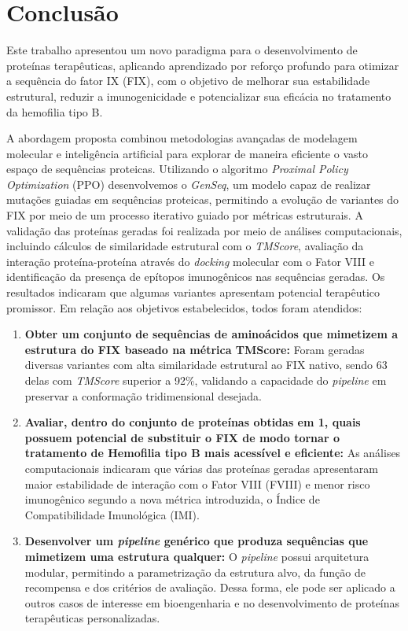 \chapter{Conclusão}

Este trabalho apresentou um novo paradigma para o desenvolvimento de proteínas terapêuticas,
aplicando aprendizado por reforço profundo para otimizar a sequência do fator IX (FIX),
com o objetivo de melhorar sua estabilidade estrutural, 
reduzir a imunogenicidade e potencializar sua eficácia no tratamento da hemofilia tipo B.  


A abordagem proposta combinou metodologias avançadas de modelagem molecular e inteligência artificial 
para explorar de maneira eficiente o vasto espaço de sequências proteicas. 
Utilizando o algoritmo \textit{Proximal Policy Optimization} (PPO)
desenvolvemos o \textit{GenSeq}, um modelo capaz de realizar mutações guiadas em sequências proteicas,
permitindo a evolução de variantes do FIX por meio de um processo iterativo
guiado por métricas estruturais.
A validação das proteínas geradas foi realizada por meio de análises computacionais, 
incluindo cálculos de similaridade estrutural com o \textit{TMScore}, 
avaliação da interação proteína-proteína através do \textit{docking} molecular com o Fator VIII
e identificação da presença de epítopos imunogênicos nas sequências geradas.
Os resultados indicaram que algumas variantes apresentam potencial terapêutico promissor.
Em relação aos objetivos estabelecidos, todos foram atendidos:

\begin{enumerate}
    \item \textbf{Obter um conjunto de sequências de aminoácidos que mimetizem a estrutura do FIX baseado na métrica TMScore:} 
    Foram geradas diversas variantes com alta similaridade estrutural ao FIX nativo, sendo 
    63 delas com \textit{TMScore} superior a 92\%,
    validando a capacidade do \textit{pipeline} em preservar a conformação tridimensional desejada.
    \item \textbf{Avaliar, dentro do conjunto de proteínas obtidas em 1, quais possuem potencial de substituir o FIX de modo tornar o tratamento de Hemofilia tipo B mais acessível e eficiente:} 
    As análises computacionais indicaram que várias das proteínas geradas apresentaram 
    maior estabilidade de interação com o Fator VIII (FVIII) 
    e menor risco imunogênico segundo a nova métrica introduzida, 
    o Índice de Compatibilidade Imunológica (IMI). 
    \item \textbf{Desenvolver um \textit{pipeline} genérico que produza sequências que mimetizem uma estrutura qualquer:} 
    O \textit{pipeline} possui arquitetura modular, 
    permitindo a parametrização da estrutura alvo, 
    da função de recompensa e dos critérios de avaliação. 
    Dessa forma, ele pode ser aplicado a outros casos de interesse 
    em bioengenharia e no desenvolvimento de proteínas terapêuticas personalizadas.
\end{enumerate}


